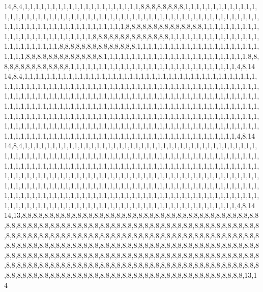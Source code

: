 14,8,4,1,1,1,1,1,1,1,1,1,1,1,1,1,1,1,1,1,1,1,1,1,8,8,8,8,8,8,8,8,1,1,1,1,1,1,1,1,1,1,1,1,1,1,1,1,1,1,1,1,1,1,1,1,1,1,1,1,1,1,1,1,1,1,1,1,1,1,1,1,1,1,1,1,1,1,1,1,1,1,1,1,1,1,1,1,1,1,1,1,1,1,1,1,1,1,1,1,1,1,1,1,1,1,1,1,1,1,1,1,1,8,8,8,8,8,8,8,8,8,8,8,8,8,8,1,1,1,1,1,1,1,1,1,1,1,1,1,1,1,1,1,1,1,1,1,1,1,1,1,1,8,8,8,8,8,8,8,8,8,8,8,8,8,8,1,1,1,1,1,1,1,1,1,1,1,1,1,1,1,1,1,1,1,1,1,1,1,1,1,1,8,8,8,8,8,8,8,8,8,8,8,8,8,8,1,1,1,1,1,1,1,1,1,1,1,1,1,1,1,1,1,1,1,1,1,1,1,1,1,1,8,8,8,8,8,8,8,8,8,8,8,8,8,8,1,1,1,1,1,1,1,1,1,1,1,1,1,1,1,1,1,1,1,1,1,1,1,1,1,1,8,8,8,8,8,8,8,8,8,8,8,8,8,8,1,1,1,1,1,1,1,1,1,1,1,1,1,1,1,1,1,1,1,1,1,1,1,1,1,1,1,1,1,1,4,8,14
14,8,4,1,1,1,1,1,1,1,1,1,1,1,1,1,1,1,1,1,1,1,1,1,1,1,1,1,1,1,1,1,1,1,1,1,1,1,1,1,1,1,1,1,1,1,1,1,1,1,1,1,1,1,1,1,1,1,1,1,1,1,1,1,1,1,1,1,1,1,1,1,1,1,1,1,1,1,1,1,1,1,1,1,1,1,1,1,1,1,1,1,1,1,1,1,1,1,1,1,1,1,1,1,1,1,1,1,1,1,1,1,1,1,1,1,1,1,1,1,1,1,1,1,1,1,1,1,1,1,1,1,1,1,1,1,1,1,1,1,1,1,1,1,1,1,1,1,1,1,1,1,1,1,1,1,1,1,1,1,1,1,1,1,1,1,1,1,1,1,1,1,1,1,1,1,1,1,1,1,1,1,1,1,1,1,1,1,1,1,1,1,1,1,1,1,1,1,1,1,1,1,1,1,1,1,1,1,1,1,1,1,1,1,1,1,1,1,1,1,1,1,1,1,1,1,1,1,1,1,1,1,1,1,1,1,1,1,1,1,1,1,1,1,1,1,1,1,1,1,1,1,1,1,1,1,1,1,1,1,1,1,1,1,1,1,1,1,1,1,1,1,1,1,1,1,1,1,1,1,1,1,1,1,1,1,1,1,1,1,1,1,1,1,1,1,1,1,1,1,1,1,1,1,1,1,1,1,1,1,1,1,1,1,1,1,1,4,8,14
14,8,4,1,1,1,1,1,1,1,1,1,1,1,1,1,1,1,1,1,1,1,1,1,1,1,1,1,1,1,1,1,1,1,1,1,1,1,1,1,1,1,1,1,1,1,1,1,1,1,1,1,1,1,1,1,1,1,1,1,1,1,1,1,1,1,1,1,1,1,1,1,1,1,1,1,1,1,1,1,1,1,1,1,1,1,1,1,1,1,1,1,1,1,1,1,1,1,1,1,1,1,1,1,1,1,1,1,1,1,1,1,1,1,1,1,1,1,1,1,1,1,1,1,1,1,1,1,1,1,1,1,1,1,1,1,1,1,1,1,1,1,1,1,1,1,1,1,1,1,1,1,1,1,1,1,1,1,1,1,1,1,1,1,1,1,1,1,1,1,1,1,1,1,1,1,1,1,1,1,1,1,1,1,1,1,1,1,1,1,1,1,1,1,1,1,1,1,1,1,1,1,1,1,1,1,1,1,1,1,1,1,1,1,1,1,1,1,1,1,1,1,1,1,1,1,1,1,1,1,1,1,1,1,1,1,1,1,1,1,1,1,1,1,1,1,1,1,1,1,1,1,1,1,1,1,1,1,1,1,1,1,1,1,1,1,1,1,1,1,1,1,1,1,1,1,1,1,1,1,1,1,1,1,1,1,1,1,1,1,1,1,1,1,1,1,1,1,1,1,1,1,1,1,1,1,1,1,1,1,1,1,1,1,1,1,1,4,8,14
14,13,8,8,8,8,8,8,8,8,8,8,8,8,8,8,8,8,8,8,8,8,8,8,8,8,8,8,8,8,8,8,8,8,8,8,8,8,8,8,8,8,8,8,8,8,8,8,8,8,8,8,8,8,8,8,8,8,8,8,8,8,8,8,8,8,8,8,8,8,8,8,8,8,8,8,8,8,8,8,8,8,8,8,8,8,8,8,8,8,8,8,8,8,8,8,8,8,8,8,8,8,8,8,8,8,8,8,8,8,8,8,8,8,8,8,8,8,8,8,8,8,8,8,8,8,8,8,8,8,8,8,8,8,8,8,8,8,8,8,8,8,8,8,8,8,8,8,8,8,8,8,8,8,8,8,8,8,8,8,8,8,8,8,8,8,8,8,8,8,8,8,8,8,8,8,8,8,8,8,8,8,8,8,8,8,8,8,8,8,8,8,8,8,8,8,8,8,8,8,8,8,8,8,8,8,8,8,8,8,8,8,8,8,8,8,8,8,8,8,8,8,8,8,8,8,8,8,8,8,8,8,8,8,8,8,8,8,8,8,8,8,8,8,8,8,8,8,8,8,8,8,8,8,8,8,8,8,8,8,8,8,8,8,8,8,8,8,8,8,8,8,8,8,8,8,8,8,8,8,8,8,8,8,8,8,8,8,8,8,8,8,8,8,8,8,8,8,8,8,8,8,8,8,8,8,8,8,8,8,8,8,8,8,8,8,8,8,13,14
